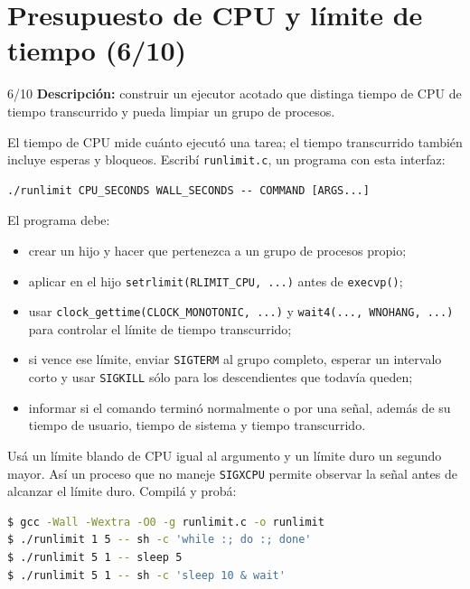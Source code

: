\documentclass[11pt,a4paper]{article}
\begin{document}
\newpage
\section{Presupuesto de CPU y límite de tiempo (6/10)}

\begin{trackbox}{6/10}
\textbf{Descripción:} construir un ejecutor acotado que distinga tiempo de
CPU de tiempo transcurrido y pueda limpiar un grupo de procesos.
\end{trackbox}

El tiempo de CPU mide cuánto ejecutó una tarea; el tiempo transcurrido también
incluye esperas y bloqueos. Escribí \texttt{runlimit.c}, un programa con esta
interfaz:

\begin{lstlisting}
./runlimit CPU_SECONDS WALL_SECONDS -- COMMAND [ARGS...]
\end{lstlisting}

El programa debe:

\begin{itemize}[leftmargin=*]
  \item crear un hijo y hacer que pertenezca a un grupo de procesos propio;
  \item aplicar en el hijo \texttt{setrlimit(RLIMIT\_CPU, ...)} antes de
  \texttt{execvp()};
  \item usar \texttt{clock\_gettime(CLOCK\_MONOTONIC, ...)} y
  \texttt{wait4(..., WNOHANG, ...)} para controlar el límite de tiempo
  transcurrido;
  \item si vence ese límite, enviar \texttt{SIGTERM} al grupo completo,
  esperar un intervalo corto y usar \texttt{SIGKILL} sólo para los
  descendientes que todavía queden;
  \item informar si el comando terminó normalmente o por una señal, además de
  su tiempo de usuario, tiempo de sistema y tiempo transcurrido.
\end{itemize}

Usá un límite blando de CPU igual al argumento y un límite duro un segundo
mayor. Así un proceso que no maneje \texttt{SIGXCPU} permite observar la señal
antes de alcanzar el límite duro. Compilá y probá:

\begin{lstlisting}[language=bash]
$ gcc -Wall -Wextra -O0 -g runlimit.c -o runlimit
$ ./runlimit 1 5 -- sh -c 'while :; do :; done'
$ ./runlimit 5 1 -- sleep 5
$ ./runlimit 5 1 -- sh -c 'sleep 10 & wait'
\end{lstlisting}
\end{document}
